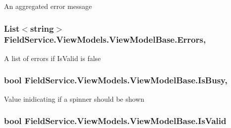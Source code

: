 An aggregated error message 

\hypertarget{class_field_service_1_1_view_models_1_1_view_model_base_acfdcc60579dad2ed4235829744454c5e}{
\subsubsection[{Errors}]{\setlength{\rightskip}{0pt plus 5cm}List$<$string$>$ Field\+Service.\+View\+Models.\+View\+Model\+Base.\+Errors\hspace{0.3cm}{\ttfamily [get]}, {\ttfamily [protected]}}}\label{class_field_service_1_1_view_models_1_1_view_model_base_acfdcc60579dad2ed4235829744454c5e}


A list of errors if Is\+Valid is false 

\hypertarget{class_field_service_1_1_view_models_1_1_view_model_base_ac79792fce62001ae8db6e7876ac0d837}{
\subsubsection[{Is\+Busy}]{\setlength{\rightskip}{0pt plus 5cm}bool Field\+Service.\+View\+Models.\+View\+Model\+Base.\+Is\+Busy\hspace{0.3cm}{\ttfamily [get]}, {\ttfamily [set]}}}\label{class_field_service_1_1_view_models_1_1_view_model_base_ac79792fce62001ae8db6e7876ac0d837}


Value inidicating if a spinner should be shown 

\hypertarget{class_field_service_1_1_view_models_1_1_view_model_base_a3eaef78dc011fb892e876d903adff375}{
\subsubsection[{Is\+Valid}]{\setlength{\rightskip}{0pt plus 5cm}bool Field\+Service.\+View\+Models.\+View\+Model\+Base.\+Is\+Valid\hspace{0.3cm}{\ttfamily [get]}}}\label{class_field_service_1_1_view_models_1_1_view_model_base_a3eaef78dc011fb892e876d903adff375}


